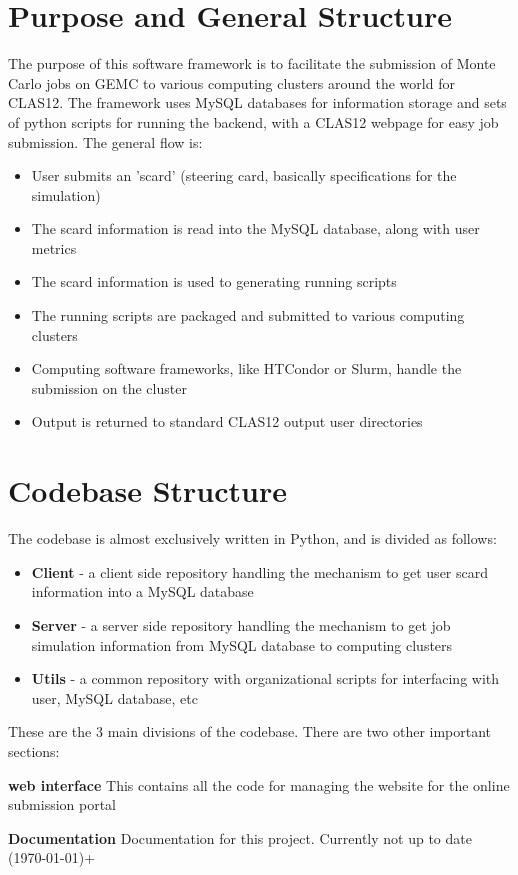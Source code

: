 \section{Purpose and General Structure}

The purpose of this software framework is to facilitate the submission of Monte Carlo jobs on GEMC to various computing clusters around the world for CLAS12. The framework uses MySQL databases for information storage and sets of python scripts for running the backend, with a CLAS12 webpage for easy job submission. The general flow is:
\begin{itemize}
  \item User submits an 'scard' (steering card, basically specifications for the simulation)
  \item The scard information is read into the MySQL database, along with user metrics
  \item The scard information is used to generating running scripts 
  \item The running scripts are packaged and submitted to various computing clusters
  \item Computing software frameworks, like HTCondor or Slurm, handle the submission on the cluster
  \item Output is returned to standard CLAS12 output user directories
\end{itemize}


\section{Codebase Structure}
The codebase is almost exclusively written in Python, and is divided as follows:
\begin{itemize}
  \item \textbf{Client} - a client side repository handling the mechanism to get user scard information into a MySQL database
  \item \textbf{Server} - a server side repository handling the mechanism to get job simulation information from MySQL database to computing clusters
  \item \textbf{Utils} - a common repository with organizational scripts for interfacing with user, MySQL database, etc
\end{itemize}
These are the 3 main divisions of the codebase. There are two other important sections:
  \begin{ite}
    \item \textbf{web interface} This contains all the code for managing the website for the online submission portal
    \item \textbf{Documentation} Documentation for this project. Currently not up to date (\today)+
  \end{ite}
